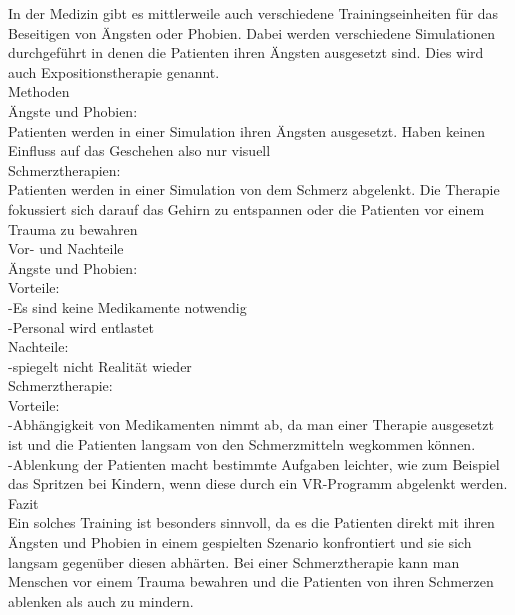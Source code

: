 
In der Medizin gibt es mittlerweile auch verschiedene Trainingseinheiten für das Beseitigen von Ängsten oder Phobien. Dabei werden verschiedene Simulationen durchgeführt in denen die Patienten ihren Ängsten ausgesetzt sind. Dies wird auch Expositionstherapie genannt.\\

Methoden\\
Ängste und Phobien:\\
Patienten werden in einer Simulation ihren Ängsten ausgesetzt. Haben keinen Einfluss auf das Geschehen also nur visuell\\

Schmerztherapien:\\
Patienten werden in einer Simulation von dem Schmerz abgelenkt. Die Therapie fokussiert sich darauf das Gehirn zu entspannen oder die Patienten vor einem Trauma zu bewahren\\

Vor- und Nachteile\\

Ängste und Phobien:\\
Vorteile:\\
-Es sind keine Medikamente notwendig\\
-Personal wird entlastet\\
Nachteile:\\
-spiegelt nicht Realität wieder\\

Schmerztherapie:\\
Vorteile:\\
-Abhängigkeit von Medikamenten nimmt ab, da man einer Therapie ausgesetzt ist und die Patienten langsam von den Schmerzmitteln wegkommen können.\\
-Ablenkung der Patienten macht bestimmte Aufgaben leichter, wie zum Beispiel das Spritzen bei Kindern, wenn diese durch ein VR-Programm abgelenkt werden.\\

Fazit\\
Ein solches Training ist besonders sinnvoll, da es die Patienten direkt mit ihren Ängsten und Phobien in einem gespielten Szenario konfrontiert und sie sich langsam gegenüber diesen abhärten. Bei einer Schmerztherapie kann man Menschen vor einem Trauma bewahren und die Patienten von ihren Schmerzen ablenken als auch zu mindern. 






